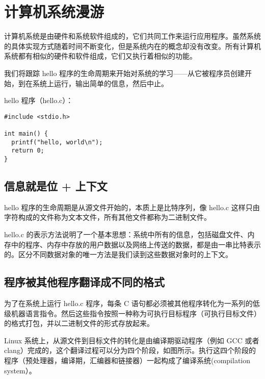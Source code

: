 \chapter{计算机系统漫游}

计算机系统是由硬件和系统软件组成的，它们共同工作来运行应用程序。虽然系统的具体实现方式随着时间不断变化，但是系统内在的概念却没有改变。所有计算机系统都有相似的硬件和软件组成，它们又执行着相似的功能。

我们将跟踪 hello 程序的生命周期来开始对系统的学习——从它被程序员创建开始，到在系统上运行，输出简单的信息，然后中止。

hello 程序（hello.c）：
\begin{verbatim}
#include <stdio.h>

int main() {
  printf("hello, world\n");
  return 0;
}
\end{verbatim}

\section{信息就是位 + 上下文}

hello 程序的生命周期是从源文件开始的，本质上是比特序列，像 hello.c 这样只由字符构成的文件称为文本文件，所有其他文件都称为二进制文件。

hello.c 的表示方法说明了一个基本思想：系统中所有的信息，包括磁盘文件、内存中的程序、内存中存放的用户数据以及网络上传送的数据，都是由一串比特表示的。区分不同数据对象的唯一方法是我们读到这些数据对象时的上下文。

\section{程序被其他程序翻译成不同的格式}

为了在系统上运行 hello.c 程序，每条 C 语句都必须被其他程序转化为一系列的低级机器语言指令。然后这些指令按照一种称为可执行目标程序（可执行目标文件）的格式打包，并以二进制文件的形式存放起来。

Linux 系统上，从源文件到目标文件的转化是由编译期驱动程序（例如 GCC 或者 clang）完成的，这个翻译过程可以分为四个阶段，如图所示。执行这四个阶段的程序（预处理器，编译期，汇编器和链接器）一起构成了编译系统(compilation system）。

